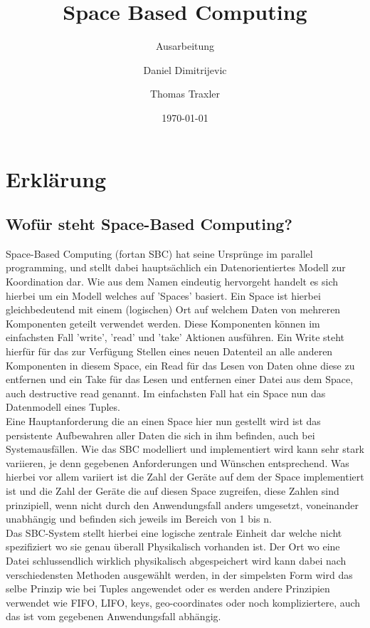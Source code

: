 \documentclass[a4paper,12pt]{scrreprt}
\begin{document}
\author{Daniel Dimitrijevic \and Thomas Traxler} %
\title{ Space Based Computing } %
\subject{VSDB} %
\subtitle{ Ausarbeitung } %
\date{\today} %
\publishers{5AHITT} %

\maketitle
\tableofcontents



\chapter{Erklärung}
	\section{Wofür steht Space-Based Computing?}
		Space-Based Computing (fortan SBC) hat seine Ursprünge im parallel programming, und stellt dabei hauptsächlich ein Datenorientiertes Modell zur Koordination dar. Wie aus dem Namen eindeutig hervorgeht handelt es sich hierbei um ein Modell welches auf 'Spaces' basiert. Ein Space ist hierbei gleichbedeutend mit einem (logischen) Ort auf welchem Daten von mehreren Komponenten geteilt verwendet werden. Diese Komponenten können im einfachsten Fall 'write', 'read' und 'take' Aktionen ausführen. Ein Write steht hierfür für das zur Verfügung Stellen eines neuen Datenteil an alle anderen Komponenten in diesem Space, ein Read für das Lesen von Daten ohne diese zu entfernen und ein Take für das Lesen und entfernen einer Datei aus dem Space, auch destructive read genannt. Im einfachsten Fall hat ein Space nun das Datenmodell eines Tuples.\\      Eine Hauptanforderung die an einen Space hier nun gestellt wird ist das persistente Aufbewahren aller Daten die sich in ihm befinden, auch bei Systemausfällen. Wie das SBC modelliert und implementiert wird kann sehr stark variieren, je denn gegebenen Anforderungen und Wünschen entsprechend. Was hierbei vor allem variiert ist die Zahl der Geräte auf dem der Space implementiert ist und die Zahl der Geräte die auf diesen Space zugreifen, diese Zahlen sind prinzipiell, wenn nicht durch den Anwendungsfall anders umgesetzt, voneinander unabhängig und befinden sich jeweils im Bereich von 1 bis n. \\   Das SBC-System stellt hierbei eine logische zentrale Einheit dar welche nicht spezifiziert wo sie genau überall Physikalisch vorhanden ist. Der Ort wo eine Datei schlussendlich wirklich physikalisch abgespeichert wird kann dabei nach verschiedensten Methoden ausgewählt werden, in der simpelsten Form wird das selbe Prinzip wie bei Tuples angewendet %
		oder es werden andere Prinzipien verwendet wie FIFO, LIFO, keys, geo-coordinates oder noch kompliziertere, auch das ist vom gegebenen Anwendungsfall abhängig.
		\cite{Steinmetz2005}
	
\end{document}
